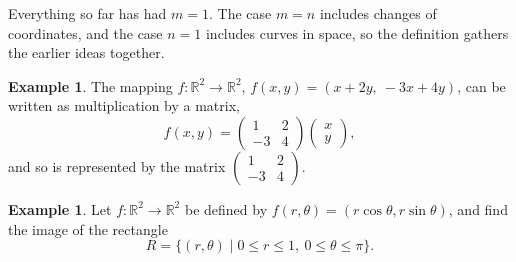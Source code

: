 \documentclass[11pt,a4paper]{article}
\theoremstyle{definition}
\newtheorem{exa}[thm]{Example}
\begin{document}
Everything so far has had $m = 1$. The case $m = n$ includes changes of
coordinates, and the case $n = 1$ includes curves in space, so the definition
gathers the earlier ideas together.

\begin{exa}
\label{ex:linearmap}
The mapping $f:\mathbb{R}^2 \to \mathbb{R}^2$, $f(x,y) = (x + 2y,\ -3x + 4y)$, can
be written as multiplication by a matrix,
\[f(x,y) =
\begin{pmatrix}
1 & 2\\
-3 & 4
\end{pmatrix}
\begin{pmatrix}
x\\
y
\end{pmatrix} ,\]
and so is represented by the matrix
$\begin{pmatrix} 1 & 2\\ -3 & 4\end{pmatrix}$.
\end{exa}

\begin{exa}
\label{ex:polarmap}
Let $f: \mathbb{R}^2 \to \mathbb{R}^2$ be defined by
$f(r,\theta) = (r\cos \theta , r\sin \theta)$, and find the image of the
rectangle
\[R = \{(r,\theta) \mid 0\leq r \leq 1,\ 0\leq \theta \leq \pi\} .\]
\end{exa}
\end{document}
